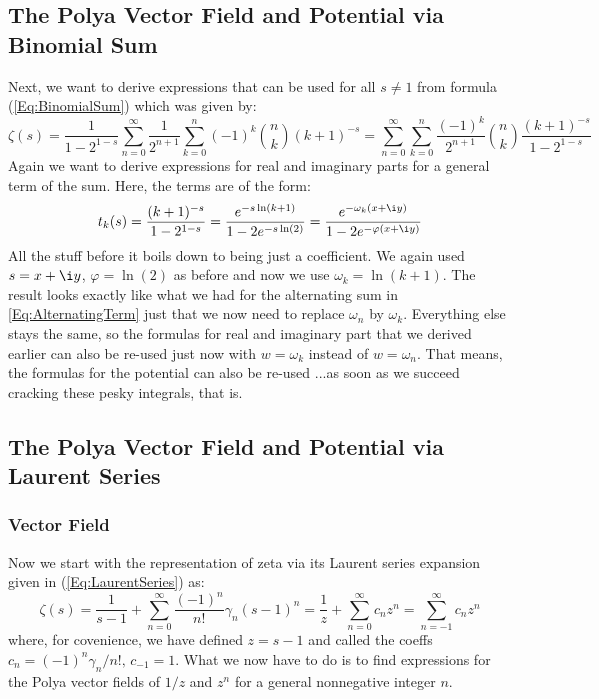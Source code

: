 \documentclass[12pt]{article}
\begin{document}
\subsection{The Polya Vector Field and Potential via Binomial Sum}


Next, we want to derive expressions that can be used for all $s \neq 1$ from formula (\ref{Eq:BinomialSum}) which was given by:
\begin{equation}
\zeta(s) 
= \frac{1}{1 - 2^{1-s}} 
  \sum_{n=0}^{\infty} \frac{1}{2^{n+1}}
  \sum_{k=0}^n (-1)^k \binom{n}{k} (k+1)^{-s}
=\sum_{n=0}^{\infty} \sum_{k=0}^n 
 \frac{(-1)^k}{2^{n+1}} \binom{n}{k} \frac{(k+1)^{-s}}{1 - 2^{1-s}} 
\end{equation}
Again we want to derive expressions for real and imaginary parts for a general term of the sum. Here, the terms are of the form:
\begin{equation}
t_k(s) 
= \frac{(k+1)^{-s}}{1 - 2^{1-s}} 
= \frac{e^{-s \ln(k+1)} }{1 - 2  e^{-s \ln(2) }}
= \frac{e^{- \omega_k (x + \i y)}}{1 - 2  e^{- \varphi (x + \i y)}}
\end{equation}
All the stuff before it boils down to being just a coefficient. We again used $s = x + \i y$, $\varphi = \ln(2)$ as before and now we use $\omega_k = \ln(k+1)$. The result looks exactly like what we had for the alternating sum in \ref{Eq:AlternatingTerm} just that we now need to replace $\omega_n$ by $\omega_k$. Everything else stays the same, so the formulas for real and imaginary part that we derived earlier can also be re-used just now with $w = \omega_k$ instead of $w = \omega_n$. That means, the formulas for the potential can also be re-used ...as soon as we succeed cracking these pesky integrals, that is.

\subsection{The Polya Vector Field and Potential via Laurent Series}

\subsubsection{Vector Field}
Now we start with the representation of zeta via its Laurent series expansion given in (\ref{Eq:LaurentSeries}) as:
\begin{equation}
\zeta(s) 
= \frac{1}{s-1} + \sum_{n=0}^{\infty} \frac{(-1)^n}{n!} \gamma_n (s-1)^n
= \frac{1}{z} + \sum_{n=0}^{\infty} c_n z^n
= \sum_{n=-1}^{\infty} c_n z^n
\end{equation}
where, for covenience, we have defined $z = s-1$ and called the coeffs $c_n = (-1)^n \gamma_n / n!, \, c_{-1} = 1$. What we now have to do is to find expressions for the Polya vector fields of $1/z$ and $z^n$ for a general nonnegative integer $n$. 
\end{document}
